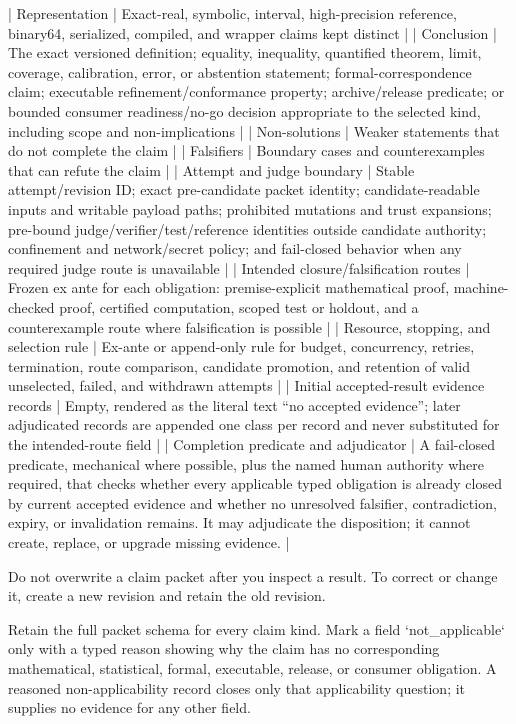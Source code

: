 \documentclass[11pt]{article}
\begin{document}
\begin{markdown}
| Representation | Exact-real, symbolic, interval, high-precision reference, binary64, serialized, compiled, and wrapper claims kept distinct |
| Conclusion | The exact versioned definition; equality, inequality, quantified theorem, limit, coverage, calibration, error, or abstention statement; formal-correspondence claim; executable refinement/conformance property; archive/release predicate; or bounded consumer readiness/no-go decision appropriate to the selected kind, including scope and non-implications |
| Non-solutions | Weaker statements that do not complete the claim |
| Falsifiers | Boundary cases and counterexamples that can refute the claim |
| Attempt and judge boundary | Stable attempt/revision ID; exact pre-candidate packet identity; candidate-readable inputs and writable payload paths; prohibited mutations and trust expansions; pre-bound judge/verifier/test/reference identities outside candidate authority; confinement and network/secret policy; and fail-closed behavior when any required judge route is unavailable |
| Intended closure/falsification routes | Frozen ex ante for each obligation: premise-explicit mathematical proof, machine-checked proof, certified computation, scoped test or holdout, and a counterexample route where falsification is possible |
| Resource, stopping, and selection rule | Ex-ante or append-only rule for budget, concurrency, retries, termination, route comparison, candidate promotion, and retention of valid unselected, failed, and withdrawn attempts |
| Initial accepted-result evidence records | Empty, rendered as the literal text “no accepted evidence”; later adjudicated records are appended one class per record and never substituted for the intended-route field |
| Completion predicate and adjudicator | A fail-closed predicate, mechanical where possible, plus the named human authority where required, that checks whether every applicable typed obligation is already closed by current accepted evidence and whether no unresolved falsifier, contradiction, expiry, or invalidation remains. It may adjudicate the disposition; it cannot create, replace, or upgrade missing evidence. |

Do not overwrite a claim packet after you inspect a result. To correct or change it, create a new
revision and retain the old revision.

Retain the full packet schema for every claim kind. Mark a field `not_applicable` only with a typed
reason showing why the claim has no corresponding mathematical, statistical, formal, executable,
release, or consumer obligation. A reasoned non-applicability record closes only that applicability
question; it supplies no evidence for any other field.


\end{markdown}
\end{document}

